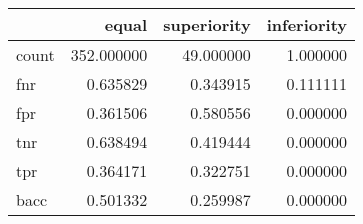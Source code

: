 \begin{tabular}{lrrr}
\toprule
{} &       equal &  superiority &  inferiority \\
\midrule
count &  352.000000 &    49.000000 &     1.000000 \\
fnr   &    0.635829 &     0.343915 &     0.111111 \\
fpr   &    0.361506 &     0.580556 &     0.000000 \\
tnr   &    0.638494 &     0.419444 &     0.000000 \\
tpr   &    0.364171 &     0.322751 &     0.000000 \\
bacc  &    0.501332 &     0.259987 &     0.000000 \\
\bottomrule
\end{tabular}
